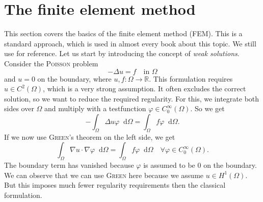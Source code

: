 \documentclass[12pt,a4paper,twoside, open=right]{scrreprt}
\theoremstyle{definition}
\theoremstyle{plain}
\newcommand{\rr}{\mathbb{R}}
\newcommand{\D}{\mathop{}\!\mathrm{d}}
\begin{document}
\section{The finite element method}
\label{sec:fem}
This section covers the basics of the finite element method (FEM). This is a standard approach, which is used in almost every book about this topic. We still use \cite{Ganesan2017} for reference.
Let us start by introducing the concept of \emph{weak solutions}. Consider the \textsc{Poisson} problem
\begin{equation}
    -\Delta u = f \quad \text{in }\Omega
\end{equation}
and $u=0$ on the boundary, where $u,f\colon \Omega\to\rr$. This formulation requires $u\in C^2(\Omega)$, which is a very strong assumption. It often excludes the correct solution, so we want to reduce the required regularity. For this, we integrate both sides over $\Omega$ and multiply with a testfunction $\varphi\in C^\infty_0(\Omega)$. So we get
\begin{equation}
    -\int_\Omega \Delta u\varphi\D\Omega =\int_\Omega f\varphi\D\Omega.
\end{equation}
If we now use \textsc{Green}'s theorem on the left side, we get
\begin{equation}
    \int_\Omega \nabla u\cdot\nabla \varphi\D\Omega = \int_\Omega f\varphi\D\Omega \quad\forall\varphi\in C^\infty_0(\Omega)\label{eq:laplace}.
\end{equation}
The boundary term has vanished because $\varphi$ is assumed to be 0 on the boundary.
We can observe that we can use \textsc{Green} here because we assume $u\in H^1(\Omega)$. But this imposes much fewer regularity requirements then the classical formulation. 
\end{document}
